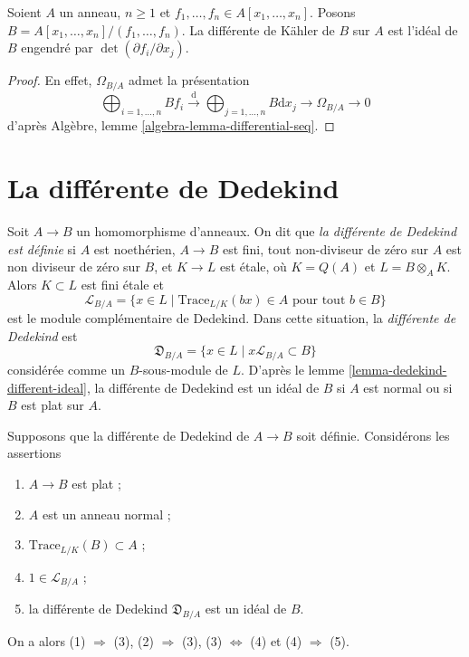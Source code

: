 \begin{lemma}
\label{lemma-kahler-different-complete-intersection}
Soient $A$ un anneau, $n \geq 1$ et
$f_1, \ldots, f_n \in A[x_1, \ldots, x_n]$.
Posons $B = A[x_1, \ldots, x_n]/(f_1, \ldots, f_n)$.
La différente de Kähler de $B$ sur $A$ est l'idéal
de $B$ engendré par $\det(\partial f_i/\partial x_j)$.
\end{lemma}

\begin{proof}
En effet, $\Omega_{B/A}$ admet la présentation
$$
\bigoplus\nolimits_{i = 1, \ldots, n} B f_i
\xrightarrow{\text{d}}
\bigoplus\nolimits_{j = 1, \ldots, n} B \text{d}x_j
\rightarrow \Omega_{B/A} \rightarrow 0
$$
d'après Algèbre, lemme \ref{algebra-lemma-differential-seq}.
\end{proof}



\section{La différente de Dedekind}
\label{section-dedekind-different}

\noindent
Soit $A \to B$ un homomorphisme d'anneaux. On dit que {\it la différente de Dedekind est définie}
si $A$ est noethérien, $A \to B$ est fini,
tout non-diviseur de zéro sur $A$ est non diviseur de zéro sur $B$, et $K \to L$ est
étale, où $K = Q(A)$ et $L = B \otimes_A K$. Alors $K \subset L$ est
fini étale et
$$
\mathcal{L}_{B/A} = \{x \in L \mid \text{Trace}_{L/K}(bx) \in A
\text{ pour tout }b \in B\}
$$
est le module complémentaire de Dedekind. Dans cette situation, la
{\it différente de Dedekind} est
$$
\mathfrak{D}_{B/A} = \{x \in L \mid x\mathcal{L}_{B/A} \subset B\}
$$
considérée comme un $B$-sous-module de $L$.
D'après le lemme \ref{lemma-dedekind-different-ideal}, la différente de Dedekind est un
idéal de $B$ si $A$ est normal ou si $B$ est plat sur $A$.

\begin{lemma}
\label{lemma-dedekind-different-ideal}
Supposons que la différente de Dedekind de $A \to B$ soit définie. Considérons les assertions
\begin{enumerate}
\item $A \to B$ est plat ;
\item $A$ est un anneau normal ;
\item $\text{Trace}_{L/K}(B) \subset A$ ;
\item $1 \in \mathcal{L}_{B/A}$ ;
\item la différente de Dedekind $\mathfrak{D}_{B/A}$ est un idéal de $B$.
\end{enumerate}
On a alors (1) $\Rightarrow$ (3), (2) $\Rightarrow$ (3),
(3) $\Leftrightarrow$ (4) et (4) $\Rightarrow$ (5).
\end{lemma}


